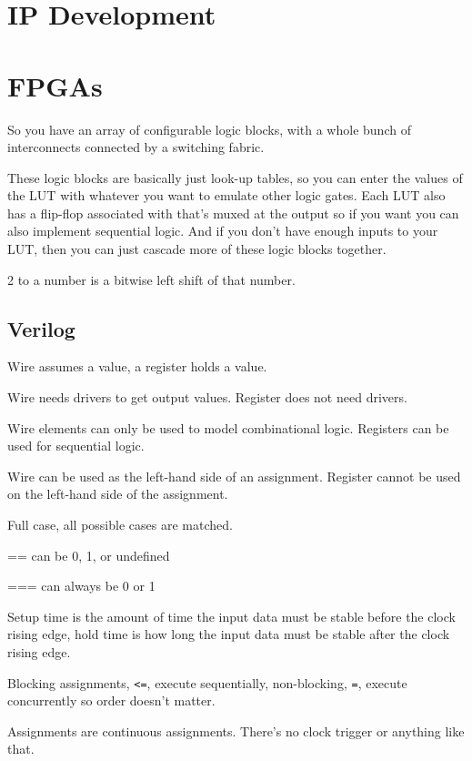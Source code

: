 \documentclass{IEEEtran}
\begin{document}
\clearpage

\section{IP Development}

\section{FPGAs}

 So you have an array of configurable logic blocks, with a whole bunch of interconnects connected by a switching fabric.

These logic blocks are basically just look-up tables, so you can enter the values of the LUT with whatever you want to emulate other logic gates. Each LUT also has a flip-flop associated with that's muxed at the output so if you want you can also implement sequential logic. And if you don't have enough inputs to your LUT, then you can just cascade more of these logic blocks together.

2 to a number is a bitwise left shift of that number.

\subsection{Verilog}

Wire assumes a value, a register holds a value.

Wire needs drivers to get output values. Register does not need drivers.

Wire elements can only be used to model combinational logic. Registers can be used for sequential logic.

Wire can be used as the left-hand side of an assignment. Register cannot be used on the left-hand side of the assignment.

Full case, all possible cases are matched.

== can be 0, 1, or undefined

=== can always be 0 or 1

Setup time is the amount of time the input data must be stable before the clock rising edge, hold time is how long the input data must be stable after the clock rising edge.

Blocking assignments, \verb|<=|, execute sequentially, non-blocking, \verb|=|, execute concurrently so order doesn't matter.

Assignments are continuous assignments. There's no clock trigger or anything like that.
\end{document}
